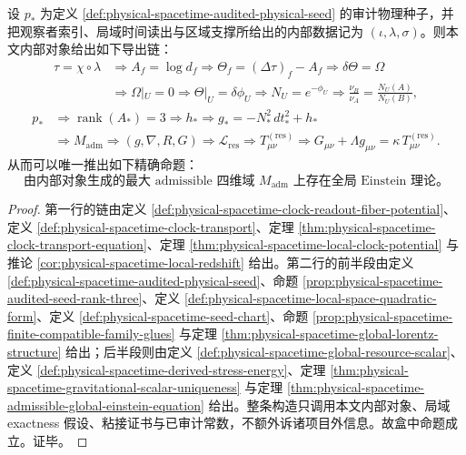 \begin{theorem}\label{thm:physical-spacetime-admissible-einstein-closure-main}
设 \(p_\ast\) 为定义 \ref{def:physical-spacetime-audited-physical-seed} 的审计物理种子，并把观察者索引、局域时间读出与区域支撑所给出的内部数据记为 \((\iota,\lambda,\sigma)\)。则本文内部对象给出如下导出链：
\[
\begin{aligned}
\tau=\chi\circ\lambda
&\Longrightarrow
A_f=\log d_f
\Longrightarrow
\Theta_f=(\Delta\tau)_f-A_f
\Longrightarrow
\delta\Theta=\Omega \\
&\Longrightarrow
\Omega|_U=0 \Rightarrow \Theta|_U=\delta\phi_U
\Longrightarrow
N_U=e^{-\phi_U}
\Longrightarrow
\frac{\nu_B}{\nu_A}=\frac{N_U(A)}{N_U(B)},
\end{aligned}
\]
\[
\begin{aligned}
p_\ast
&\Longrightarrow
\operatorname{rank}(A_\ast)=3
\Longrightarrow
h_\ast
\Longrightarrow
g_\ast=-N_\ast^2\,dt_\ast^2+h_\ast \\
&\Longrightarrow
M_{\mathrm{adm}}
\Longrightarrow
(g,\nabla,R,G)
\Longrightarrow
\mathcal L_{\mathrm{res}}
\Longrightarrow
T^{(\mathrm{res})}_{\mu\nu}
\Longrightarrow
G_{\mu\nu}+\Lambda g_{\mu\nu}=\kappa\,T^{(\mathrm{res})}_{\mu\nu}.
\end{aligned}
\]
从而可以唯一推出如下精确命题：
\[
\boxed{\text{由内部对象生成的最大 admissible 四维域 }M_{\mathrm{adm}}\text{ 上存在全局 Einstein 理论。}}
\]
\end{theorem}
\begin{proof}
第一行的链由定义 \ref{def:physical-spacetime-clock-readout-fiber-potential}、定义 \ref{def:physical-spacetime-clock-transport}、定理 \ref{thm:physical-spacetime-clock-transport-equation}、定理 \ref{thm:physical-spacetime-local-clock-potential} 与推论 \ref{cor:physical-spacetime-local-redshift} 给出。第二行的前半段由定义 \ref{def:physical-spacetime-audited-physical-seed}、命题 \ref{prop:physical-spacetime-audited-seed-rank-three}、定义 \ref{def:physical-spacetime-local-space-quadratic-form}、定义 \ref{def:physical-spacetime-seed-chart}、命题 \ref{prop:physical-spacetime-finite-compatible-family-glues} 与定理 \ref{thm:physical-spacetime-global-lorentz-structure} 给出；后半段则由定义 \ref{def:physical-spacetime-global-resource-scalar}、定义 \ref{def:physical-spacetime-derived-stress-energy}、定理 \ref{thm:physical-spacetime-gravitational-scalar-uniqueness} 与定理 \ref{thm:physical-spacetime-admissible-global-einstein-equation} 给出。整条构造只调用本文内部对象、局域 exactness 假设、粘接证书与已审计常数，不额外诉诸项目外信息。故盒中命题成立。证毕。
\end{proof}

